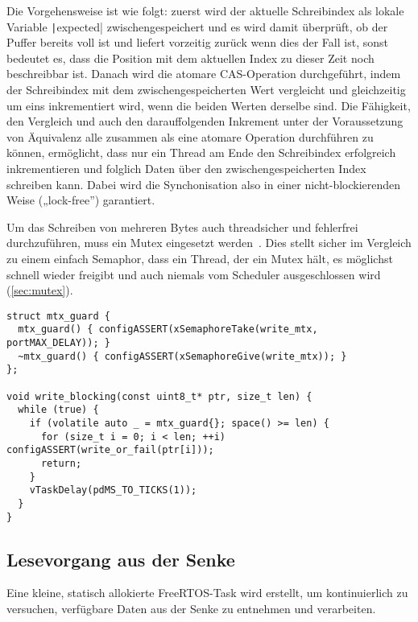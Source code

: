 Die Vorgehensweise ist wie folgt: zuerst wird der aktuelle Schreibindex als
lokale Variable \texttt|expected| zwischengespeichert und es wird damit
überprüft, ob der Puffer bereits voll ist und liefert vorzeitig zurück wenn dies
der Fall ist, sonst bedeutet es, dass die Position mit dem aktuellen Index zu
dieser Zeit noch beschreibbar ist. Danach wird die atomare CAS-Operation
durchgeführt, indem der Schreibindex mit dem zwischengespeicherten Wert
vergleicht und gleichzeitig um eins inkrementiert wird, wenn die beiden Werten
derselbe sind. Die Fähigkeit, den Vergleich und auch den darauffolgenden
Inkrement unter der Voraussetzung von Äquivalenz alle zusammen als eine atomare
Operation durchführen zu können, ermöglicht, dass nur ein Thread am Ende den
Schreibindex erfolgreich inkrementieren und folglich Daten über den
zwischengespeicherten Index schreiben kann. Dabei wird die Synchonisation also
in einer nicht-blockierenden Weise („lock-free”) garantiert.

Um das Schreiben von mehreren Bytes auch threadsicher und fehlerfrei
durchzuführen, muss ein Mutex eingesetzt werden~\cite{FreeRTOSForumPrintf}. Dies
stellt sicher im Vergleich zu einem einfach Semaphor, dass ein Thread, der ein
Mutex hält, es möglichst schnell wieder freigibt und auch niemals vom Scheduler
ausgeschlossen wird (\ref{sec:mutex}).

\begin{code}
\begin{verbatim}
struct mtx_guard {
  mtx_guard() { configASSERT(xSemaphoreTake(write_mtx, portMAX_DELAY)); }
  ~mtx_guard() { configASSERT(xSemaphoreGive(write_mtx)); }
};

void write_blocking(const uint8_t* ptr, size_t len) {
  while (true) {
    if (volatile auto _ = mtx_guard{}; space() >= len) {
      for (size_t i = 0; i < len; ++i) configASSERT(write_or_fail(ptr[i]));
      return;
    }
    vTaskDelay(pdMS_TO_TICKS(1));
  }
}
\end{verbatim}
\end{code}

\subsection{Lesevorgang aus der Senke}

Eine kleine, statisch allokierte FreeRTOS-Task wird erstellt, um kontinuierlich
zu versuchen, verfügbare Daten aus der Senke zu entnehmen und verarbeiten.

